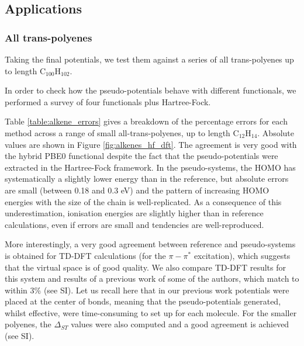 \documentclass[12pt]{article}
\begin{document}
\subsection*{\sffamily \large Applications}

\subsubsection*{\sffamily \large All trans-polyenes}

Taking the final potentials, we test them against a series of all trans-polyenes up to length C\(_{100}\)H\(_{102}\).

In order to check how the pseudo-potentials behave with different functionals, we performed a survey of four functionals plus Hartree-Fock.

Table \ref{table:alkene_errors} gives a breakdown of the percentage errors for each method across
a range of small all-trans-polyenes, up to length C$_{12}$H$_{14}$.
Absolute values are shown in Figure \ref{fig:alkenes_hf_dft}.
The agreement is very good with the hybrid PBE0 functional despite the fact that the pseudo-potentials
were extracted in the Hartree-Fock framework.
In the pseudo-systems, the HOMO has systematically a slightly lower energy than in the reference, but absolute errors are small (between 0.18 and 0.3 eV) and the pattern of increasing HOMO energies with the size of the chain is well-replicated. As a consequence of this underestimation, 
ionisation energies are slightly higher than in reference calculations, even if errors are small and tendencies are well-reproduced. 

More interestingly, a very good agreement between reference and pseudo-systems is obtained for TD-DFT
calculations (for the $\pi-\pi^*$ excitation), which suggests that the virtual space is of good
quality.
We also compare TD-DFT results for this system and results of a previous work of some of the authors, which match to within 3\% (see SI).\cite{drujon_pseudopotentials_2013}
Let us recall here that in our previous work potentials were placed at the center of bonds, meaning that the pseudo-potentials generated, whilst effective, were time-consuming to set up for each molecule.
For the smaller polyenes, the $\Delta_{ST}$ values were also computed and a good agreement is achieved (see SI).
\end{document}

